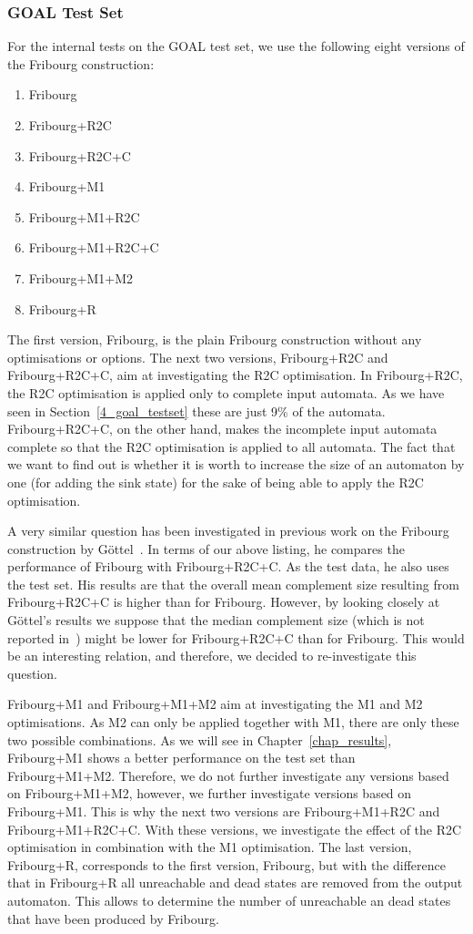 \subsubsection{GOAL Test Set}
For the internal tests on the GOAL test set, we use the following eight versions of the Fribourg construction:
\begin{enumerate}
\item Fribourg
\item Fribourg+R2C
\item Fribourg+R2C+C
\item Fribourg+M1
\item Fribourg+M1+R2C
\item Fribourg+M1+R2C+C
\item Fribourg+M1+M2
\item Fribourg+R
\end{enumerate}

The first version, Fribourg, is the plain Fribourg construction without any optimisations or options. The next two versions, Fribourg+R2C and Fribourg+R2C+C, aim at investigating the R2C optimisation. In Fribourg+R2C, the R2C optimisation is applied only to complete input automata. As we have seen in Section~\ref{4_goal_testset} these are just 9\% of the automata. Fribourg+R2C+C, on the other hand, makes the incomplete input automata complete so that the R2C optimisation is applied to all automata. The fact that we want to find out is whether it is worth to increase the size of an automaton by one (for adding the sink state) for the sake of being able to apply the R2C optimisation.

A very similar question has been investigated in previous work on the Fribourg construction by Göttel~\cite{2013_bsc_goettel}. In terms of our above listing, he compares the performance of Fribourg with Fribourg+R2C+C. As the test data, he also uses the \goal{} test set. His results are that the overall mean complement size resulting from Fribourg+R2C+C is higher than for Fribourg. However, by looking closely at Göttel's results we suppose that the median complement size (which is not reported in~\cite{2013_bsc_goettel}) might be lower for Fribourg+R2C+C than for Fribourg. This would be an interesting relation, and therefore, we decided to re-investigate this question. 

Fribourg+M1 and Fribourg+M1+M2 aim at investigating the M1 and M2 optimisations. As M2 can only be applied together with M1, there are only these two possible combinations. As we will see in Chapter~\ref{chap_results}, Fribourg+M1 shows a better performance on the \goal{} test set than Fribourg+M1+M2. Therefore, we do not further investigate any versions based on Fribourg+M1+M2, however, we further investigate versions based on Fribourg+M1. This is why the next two versions are Fribourg+M1+R2C and Fribourg+M1+R2C+C. With these versions, we investigate the effect of the R2C optimisation in combination with the M1 optimisation. The last version, Fribourg+R, corresponds to the first version, Fribourg, but with the difference that in Fribourg+R all unreachable and dead states are removed from the output automaton. This allows to determine the number of unreachable an dead states that have been produced by Fribourg.

